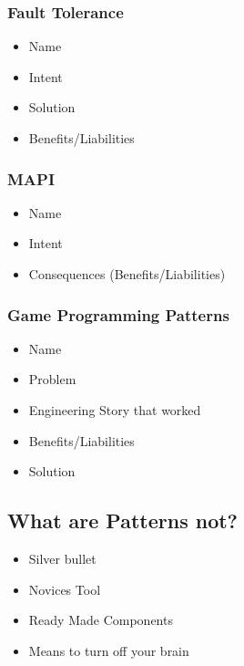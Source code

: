 \subsubsection{Fault Tolerance}
\begin{itemize}[topsep=0pt]
    \itemsep -0.4em
    \item Name
    \item Intent
    \item Solution
    \item Benefits/Liabilities
\end{itemize}
\subsubsection{MAPI}
\begin{itemize}[topsep=0pt]
    \itemsep -0.4em
    \item Name
    \item Intent
    \item Consequences (Benefits/Liabilities)
\end{itemize}
\subsubsection{Game Programming Patterns}
\begin{itemize}[topsep=0pt]
    \itemsep -0.4em
    \item Name
    \item Problem
    \item Engineering Story that worked
    \item Benefits/Liabilities
    \item Solution
\end{itemize}

\subsection{What are Patterns not?}
\begin{itemize}[topsep=0pt]
    \itemsep -0.4em
    \item Silver bullet
    \item Novices Tool
    \item Ready Made Components
    \item Means to turn off your brain
\end{itemize}
